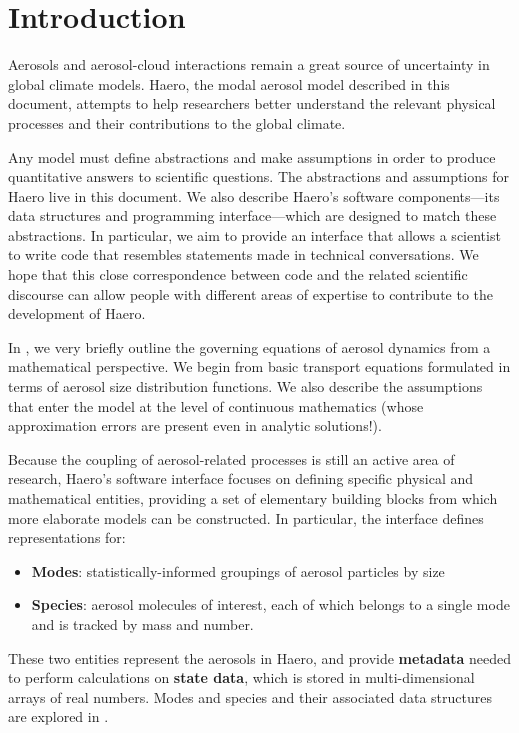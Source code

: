 \section{Introduction}

Aerosols and aerosol-cloud interactions remain a great source of uncertainty
in global climate models. Haero, the modal aerosol model described in this
document, attempts to help researchers better understand the relevant physical
processes and their contributions to the global climate.

Any model must define abstractions and make assumptions in order to produce
quantitative answers to scientific questions. The abstractions and assumptions
for Haero live in this document. We also describe Haero's software
components---its data structures and programming interface---which are designed
to match these abstractions. In particular, we aim to provide an interface that
allows a scientist to write code that resembles statements made in technical
conversations. We hope that this close correspondence between code and
the related scientific discourse can allow people with different areas of
expertise to contribute to the development of Haero.

In , we very briefly outline the governing equations of
aerosol dynamics from a mathematical perspective. We begin from basic transport
equations formulated in terms of aerosol size distribution functions. We also
describe the assumptions that enter the model at the level of continuous
mathematics (whose approximation errors are present even in analytic
solutions!).

Because the coupling of aerosol-related processes is still an active area of
research, Haero's software interface focuses on defining specific physical and
mathematical entities, providing a set of elementary building blocks from which
more elaborate models can be constructed. In particular, the interface defines
representations for:

\begin{itemize}
  \item {\bf Modes}: statistically-informed groupings of aerosol particles by
        size
  \item {\bf Species}: aerosol molecules of interest, each of which belongs to a
        single mode and is tracked by mass and number.
\end{itemize}

These two entities represent the aerosols in Haero, and provide {\bf metadata} needed to
perform calculations on {\bf state data}, which is stored in multi-dimensional
arrays of real numbers. Modes and species and their associated data structures
are explored in .

